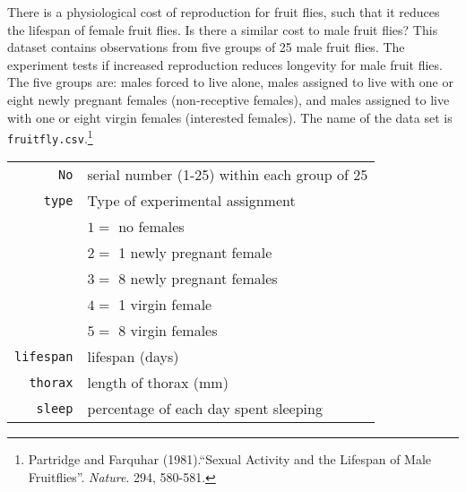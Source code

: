 \documentclass[12pt,letterpaper]{article}
\begin{document}
There is a physiological cost of reproduction for fruit flies, such that it reduces the lifespan of female fruit flies.  Is there a similar cost to male fruit flies?  This dataset contains observations from five groups of 25 male fruit flies. The experiment tests if increased reproduction reduces longevity for male fruit flies. The five groups are: males forced to live alone, males assigned to live with one or eight newly pregnant females (non-receptive females), and males assigned to live with one or eight virgin females (interested females). The name of the data set is \texttt{fruitfly.csv}.\footnote{Partridge and Farquhar (1981).``Sexual Activity and the Lifespan of Male Fruitflies''. \textit{Nature}. 294, 580-581.}
	\vspace{1cm}

\begin{tabular}{r|l}
	\texttt{No} & serial number (1-25) within each group of 25\\
	\texttt{type} & Type of experimental assignment \\
	& \hspace{0.1in} $1=$ no females  \\
	& \hspace{0.1in} $2=$ 1 newly pregnant female \\
	& \hspace{0.1in} $3=$ 8 newly pregnant females\\
	& \hspace{0.1in} $4=$ 1 virgin female\\
	& \hspace{0.1in} $5=$ 8 virgin females\\
	\texttt{lifespan} & lifespan (days)\\
	\texttt{thorax} & length of thorax (mm)\\
	\texttt{sleep} & percentage of each day spent sleeping\\
\end{tabular}
	\vspace{1cm}
\end{document}
